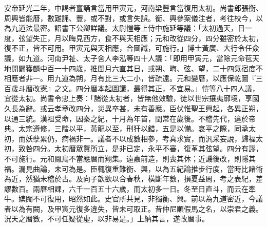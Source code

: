 \begin{pinyinscope}
安帝延光二年，中謁者亶誦言當用甲寅元，河南梁豐言當復用太初。尚書郎張衡、周興皆能曆，數難誦、豐，或不對，或言失誤。衡、興參案儀注者，考往校今，以為九道法最密。詔書下公卿詳議。太尉愷等上侍中施延等議：「太初過天，日一度，弦望失正，月以晦見西方，食不與天相應；元和改從四分，四分雖密於太初，復不正，皆不可用。甲寅元與天相應，合圖讖，可施行。」博士黃廣、大行令任僉議，如九道。河南尹祉、太子舍人李泓等四十人議：「即用甲寅元，當除元命苞天地開闢獲麟中百一十四歲，推閏月六直其日，或朔、晦、弦、望，二十四氣宿度不相應者非一。用九道為朔，月有比三大二小，皆疏遠。元和變曆，以應保乾圖『三百歲斗曆改憲』之文。四分曆本起圖讖，最得其正，不宜易。」愷等八十四人議，宜從太初。尚書令忠上奏：「諸從太初者，皆無他效驗，徒以世宗攘夷廓境，享國久長為辭。或云孝章改四分，災異卒甚，未有善應。臣伏惟聖王興起，各異正朔，以通三統。漢祖受命，因秦之紀，十月為年首，閏常在歲後。不稽先代，違於帝典。太宗遵修，三階以平，黃龍以至，刑犴以錯，五是以備。哀平之際，同承太初，而妖孽累仍，痾禍非一。議者不以成數相參，考真求實，而汎采妄說，歸福太初，致咎四分。太初曆眾賢所立，是非已定，永平不審，復革其弦望。四分有謬，不可施行。元和鳳鳥不當應曆而翔集。遠嘉前造，則喪其休；近譏後改，則隱其福。漏見曲論，未可為是。臣輒復重難衡、興，以為五紀論推步行度，當時比諸術為近，然猶未稽於古。及向子歆欲以合春秋，橫斷年數，損夏益周，考之表紀，差謬數百。兩曆相課，六千一百五十六歲，而太初多一日。冬至日直斗，而云在牽牛。嫔闊不可復用，昭然如此。史官所共見，非獨衡、興。前以為九道密近，今議者以為有闕，及甲寅元復多違失，皆未可取正。昔仲尼順假馬之名，以崇君之義。況天之曆數，不可任疑從虛，以非易是。」上納其言，遂改曆事。


\end{pinyinscope}
